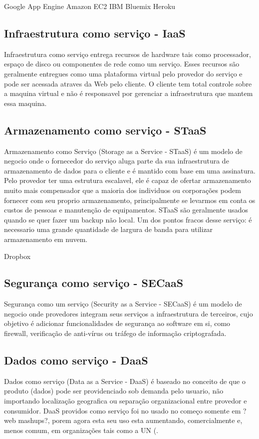	Google App Engine
	Amazon EC2
	IBM Bluemix
	Heroku

\subsection{Infraestrutura como serviço - IaaS}
	Infraestrutura como serviço entrega recursos de hardware tais como processador, espaço de disco ou componentes de rede como um serviço. Esses recursos são geralmente entregues como uma plataforma virtual pelo provedor do serviço e pode ser acessada atraves da Web pelo cliente. O cliente tem total controle sobre a maquina virtual e não é responsavel por gerenciar a infraestrutura que mantem essa maquina.
	

\subsection{Armazenamento como serviço - STaaS}
	Armazenamento como Serviço (Storage as a Service - STaaS) é um modelo de negocio onde o fornecedor do serviço aluga parte da sua infraestrutura de armazenamento de dados para o cliente e é mantido com base em uma assinatura. Pelo provedor ter uma estrutura escalavel, ele é capaz de ofertar armazenamento muito mais compensador que a maioria dos individuos ou corporações podem fornecer com seu proprio armazenamento, principalmente se levarmos em conta os custos de pessoas e manutenção de equipamentos. STaaS são geralmente usados quando se quer fazer um backup não local. Um dos pontos fracos desse serviço: é necessario uma grande quantidade de largura de banda para utilizar armazenamento em nuvem.
	
	Dropbox
\subsection{Segurança como serviço - SECaaS}
	Segurança como um serviço (Security as a Service - SECaaS) é um modelo de negocio onde provedores integram seus serviços a infraestrutura de terceiros, cujo objetivo é adicionar funcionalidades de segurança ao software em si, como firewall, verificação de anti-vírus ou tráfego de informação criptografada.
	

\subsection{Dados como serviço - DaaS}
	Dados como serviço (Data as a Service - DaaS) é baseado no conceito de que o produto (dados) pode ser providenciado sob demanda pelo usuario, não importando localização geografica ou separação organizacional entre provedor e consumidor. DaaS providos como serviço foi no usado no começo somente em ?web mashups?, porem agora esta seu uso esta aumentando, comercialmente e, menos comum, em organizações tais como a UN (.
	
